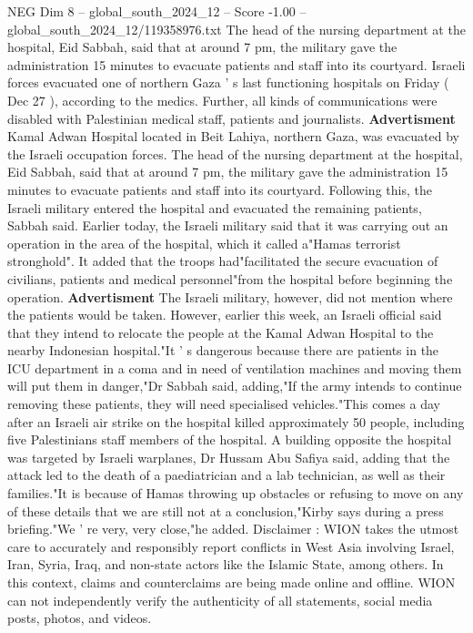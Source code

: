 \begin{textsample}{NEG Dim 8 – global\_south\_2024\_12 – Score -1.00 – global\_south\_2024\_12/119358976.txt}  \label{ex:f8_neg_106}
The head of the nursing department at the hospital, Eid Sabbah, said that at around 7 pm, the military gave the administration 15 minutes to evacuate patients and staff into its courtyard.
Israeli forces evacuated one of northern Gaza ' s last functioning hospitals on Friday ( Dec 27 ), according to the medics.
Further, all kinds of communications were disabled with Palestinian medical staff, patients and journalists. \textbf{Advertisment} Kamal Adwan Hospital located in Beit Lahiya, northern Gaza, was evacuated by the Israeli occupation forces.
The head of the nursing department at the hospital, Eid Sabbah, said that at around 7 pm, the military gave the administration 15 minutes to evacuate patients and staff into its courtyard.
Following this, the Israeli military entered the hospital and evacuated the remaining patients, Sabbah said.
Earlier today, the Israeli military said that it was carrying out an operation in the area of the hospital, which it called a"Hamas terrorist stronghold".
It added that the troops had"facilitated the secure evacuation of civilians, patients and medical personnel"from the hospital before beginning the operation. \textbf{Advertisment} The Israeli military, however, did not mention where the patients would be taken.
However, earlier this week, an Israeli official said that they intend to relocate the people at the Kamal Adwan Hospital to the nearby Indonesian hospital."It ' s dangerous because there are patients in the ICU department in a coma and in need of ventilation machines and moving them will put them in danger,"Dr Sabbah said, adding,"If the army intends to continue removing these patients, they will need specialised vehicles."This comes a day after an Israeli air strike on the hospital killed approximately 50 people, including five Palestinians staff members of the hospital.
A building opposite the hospital was targeted by Israeli warplanes, Dr Hussam Abu Safiya said, adding that the attack led to the death of a paediatrician and a lab technician, as well as their families."It is because of Hamas throwing up obstacles or refusing to move on any of these details that we are still not at a conclusion,"Kirby says during a press briefing."We ' re very, very close,"he added.
Disclaimer : WION takes the utmost care to accurately and responsibly report conflicts in West Asia involving Israel, Iran, Syria, Iraq, and non-state actors like the Islamic State, among others.
In this context, claims and counterclaims are being made online and offline.
WION can not independently verify the authenticity of all statements, social media posts, photos, and videos.

\end{textsample}
